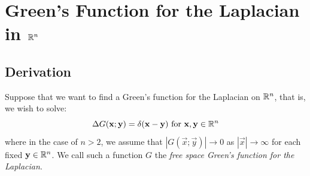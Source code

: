 \documentclass[../main.tex]{subfiles}
\begin{document}
\section{Green's Function for the Laplacian in \texorpdfstring{$\mathbb{R}^{n}$}{Higher Dimensions}}
\subsection{Derivation}
Suppose that we want to find a Green's function for the Laplacian on $\mathbb{R}^{n}$, that is, we wish to solve:
\[
  \Delta G(\mathbf{\bm{x}}; \mathbf{\bm{y}}) = \delta(\mathbf{\bm{x}} - \mathbf{\bm{y}}) \text{ for } \mathbf{\bm{x}}, \mathbf{\bm{y}} \in \mathbb{R}^{n}
\]
where in the case of $n > 2$, we assume that $|G(\vec{x}; \vec{y})| \to 0$ as $|\vec{x}| \to \infty$ for each fixed $\mathbf{\bm{y}} \in \mathbb{R}^{n}$.
We call such a function $G$ the \textit{free space Green's function for the Laplacian}.
\end{document}
